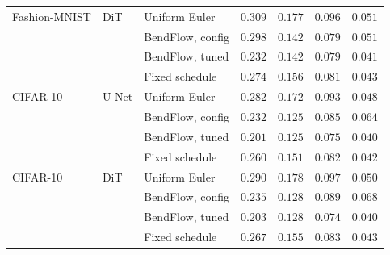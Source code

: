 \documentclass{article}
\theoremstyle{remark}
\begin{document}
\begin{table}[p]
\begin{tabular}{lllcccc}
\addlinespace
Fashion-MNIST & DiT & Uniform Euler & $0.309$ & $0.177$ & $0.096$ & $0.051$\\
 &  & BendFlow, config & $0.298$ & $\mathbf{0.142}$ & $\mathbf{0.079}$ & $0.051$\\
 &  & BendFlow, tuned & $\mathbf{0.232}$ & $\mathbf{0.142}$ & $\mathbf{0.079}$ & $\mathbf{0.041}$\\
 &  & Fixed schedule & $0.274$ & $0.156$ & $0.081$ & $0.043$\\
\addlinespace
CIFAR-10 & U-Net & Uniform Euler & $0.282$ & $0.172$ & $0.093$ & $0.048$\\
 &  & BendFlow, config & $0.232$ & $\mathbf{0.125}$ & $0.085$ & $0.064$\\
 &  & BendFlow, tuned & $\mathbf{0.201}$ & $\mathbf{0.125}$ & $\mathbf{0.075}$ & $\mathbf{0.040}$\\
 &  & Fixed schedule & $0.260$ & $0.151$ & $0.082$ & $0.042$\\
\addlinespace
CIFAR-10 & DiT & Uniform Euler & $0.290$ & $0.178$ & $0.097$ & $0.050$\\
 &  & BendFlow, config & $0.235$ & $\mathbf{0.128}$ & $0.089$ & $0.068$\\
 &  & BendFlow, tuned & $\mathbf{0.203}$ & $\mathbf{0.128}$ & $\mathbf{0.074}$ & $\mathbf{0.040}$\\
 &  & Fixed schedule & $0.267$ & $0.155$ & $0.083$ & $0.043$\\
\bottomrule
\end{tabular}
\end{table}
\end{document}
